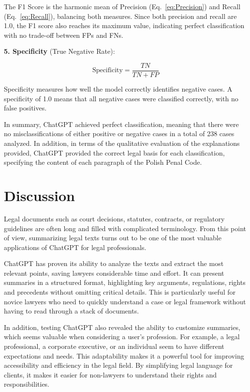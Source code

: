\documentclass[preprint,12pt,number]{elsarticle}
\begin{document}
The F1 Score is the harmonic mean of Precision (Eq.~\ref{eq:Precision}) and Recall (Eq.~\ref{eq:Recall}), balancing both measures. Since both precision and recall are 1.0, the F1 score also reaches its maximum value, indicating perfect classification with no trade-off between FPs and FNs.

\textbf{5. Specificity} (True Negative Rate):

\begin{equation}\label{eq:Specificity}
    \text{Specificity} = \frac{TN}{TN + FP}    
\end{equation}

Specificity measures how well the model correctly identifies negative cases. A specificity of 1.0 means that all negative cases were classified correctly, with no false positives.

In summary, ChatGPT achieved perfect classification, meaning that there were no misclassifications of either positive or negative cases in a total of 238 cases analyzed. In addition, in terms of the qualitative evaluation of the explanations provided, ChatGPT provided the correct legal basis for each classification, specifying the content of each paragraph of the Polish Penal Code. 




\section{Discussion}
\label{sec:discussion}
Legal documents such as court decisions, statutes, contracts, or regulatory guidelines are often long and filled with complicated terminology. From this point of view, summarizing legal texts turns out to be one of the most valuable applications of ChatGPT for legal professionals. 

ChatGPT has proven its ability to analyze the texts and extract the most relevant points, saving lawyers considerable time and effort. It can present summaries in a structured format, highlighting key arguments, regulations, rights and precedents without omitting critical details. This is particularly useful for novice lawyers who need to quickly understand a case or legal framework without having to read through a stack of documents.

In addition, testing ChatGPT also revealed the ability to customize summaries, which seems valuable when considering a user's profession. For example, a legal professional, a corporate executive, or an individual seem to have different expectations and needs. This adaptability makes it a powerful tool for improving accessibility and efficiency in the legal field. By simplifying legal language for clients, it makes it easier for non-lawyers to understand their rights and responsibilities. 
\end{document}
